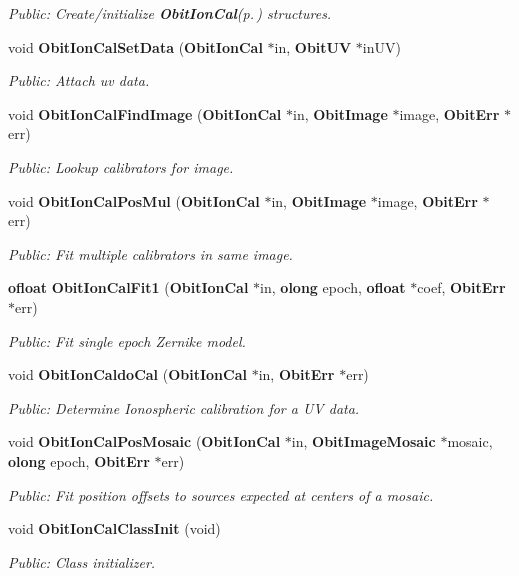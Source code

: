 \begin{CompactItemize}
\begin{CompactList}\small\item\em Public: Create/initialize {\bf Obit\-Ion\-Cal}{\rm (p.\,\pageref{structObitIonCal})} structures. \item\end{CompactList}\item 
void {\bf Obit\-Ion\-Cal\-Set\-Data} ({\bf Obit\-Ion\-Cal} $\ast$in, {\bf Obit\-UV} $\ast$in\-UV)
\begin{CompactList}\small\item\em Public: Attach uv data. \item\end{CompactList}\item 
void {\bf Obit\-Ion\-Cal\-Find\-Image} ({\bf Obit\-Ion\-Cal} $\ast$in, {\bf Obit\-Image} $\ast$image, {\bf Obit\-Err} $\ast$err)
\begin{CompactList}\small\item\em Public: Lookup calibrators for image. \item\end{CompactList}\item 
void {\bf Obit\-Ion\-Cal\-Pos\-Mul} ({\bf Obit\-Ion\-Cal} $\ast$in, {\bf Obit\-Image} $\ast$image, {\bf Obit\-Err} $\ast$err)
\begin{CompactList}\small\item\em Public: Fit multiple calibrators in same image. \item\end{CompactList}\item 
{\bf ofloat} {\bf Obit\-Ion\-Cal\-Fit1} ({\bf Obit\-Ion\-Cal} $\ast$in, {\bf olong} epoch, {\bf ofloat} $\ast$coef, {\bf Obit\-Err} $\ast$err)
\begin{CompactList}\small\item\em Public: Fit single epoch Zernike model. \item\end{CompactList}\item 
void {\bf Obit\-Ion\-Caldo\-Cal} ({\bf Obit\-Ion\-Cal} $\ast$in, {\bf Obit\-Err} $\ast$err)
\begin{CompactList}\small\item\em Public: Determine Ionospheric calibration for a UV data. \item\end{CompactList}\item 
void {\bf Obit\-Ion\-Cal\-Pos\-Mosaic} ({\bf Obit\-Ion\-Cal} $\ast$in, {\bf Obit\-Image\-Mosaic} $\ast$mosaic, {\bf olong} epoch, {\bf Obit\-Err} $\ast$err)
\begin{CompactList}\small\item\em Public: Fit position offsets to sources expected at centers of a mosaic. \item\end{CompactList}\item 
void {\bf Obit\-Ion\-Cal\-Class\-Init} (void)
\begin{CompactList}\small\item\em Public: Class initializer. \item\end{CompactList}\end{CompactItemize}



